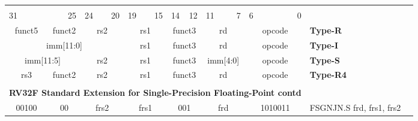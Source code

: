 \documentclass{report}
\begin{document}
\begin{table}[p]
\begin{small}
\begin{center}
\begin{tabular}{p{0.05mm}p{0.05mm}p{0.05mm}p{0.05mm}p{0.05mm}p{0.05mm}p{0.05mm}p{0.05mm}p{0.05mm}p{0.05mm}p{0.05mm}p{0.05mm}p{0.05mm}p{0.05mm}p{0.05mm}p{0.05mm}p{0.05mm}p{0.05mm}p{0.05mm}p{0.05mm}p{0.05mm}p{0.05mm}p{0.05mm}p{0.05mm}p{0.05mm}p{0.05mm}p{0.05mm}p{0.05mm}p{0.05mm}p{0.05mm}p{0.05mm}p{0.05mm}p{50mm}l}& & & & & & & & & & & & & & & & & & & & & & & & & & & & & & & & & \\
\multicolumn{3}{l}{\scriptsize{31}} & \multicolumn{4}{r}{\scriptsize{25}} & \multicolumn{2}{l}{\scriptsize{24}} & \multicolumn{3}{r}{\scriptsize{20}} & \multicolumn{2}{l}{\scriptsize{19}} & \multicolumn{3}{r}{\scriptsize{15}} & \multicolumn{1}{l}{\scriptsize{14}} & \multicolumn{2}{r}{\scriptsize{12}} & \multicolumn{2}{l}{\scriptsize{11}} & \multicolumn{3}{r}{\scriptsize{7}} & \multicolumn{3}{l}{\scriptsize{6}} & \multicolumn{4}{r}{\scriptsize{0}} &  \\
\cline{1-32}
\multicolumn{5}{|c|}{funct5} & \multicolumn{2}{c|}{funct2} & \multicolumn{5}{c|}{rs2} & \multicolumn{5}{c|}{rs1} & \multicolumn{3}{c|}{funct3} & \multicolumn{5}{c|}{rd} & \multicolumn{7}{c|}{opcode} & \scriptsize{\bf Type-R} \\
\cline{1-32}
\multicolumn{12}{|c|}{imm[11:0]} & \multicolumn{5}{c|}{rs1} & \multicolumn{3}{c|}{funct3} & \multicolumn{5}{c|}{rd} & \multicolumn{7}{c|}{opcode} & \scriptsize{\bf Type-I} \\
\cline{1-32}
\multicolumn{7}{|c|}{imm[11:5]} & \multicolumn{5}{c|}{rs2} & \multicolumn{5}{c|}{rs1} & \multicolumn{3}{c|}{funct3} & \multicolumn{5}{c|}{imm[4:0]} & \multicolumn{7}{c|}{opcode} & \scriptsize{\bf Type-S} \\
\cline{1-32}
\multicolumn{5}{|c|}{rs3} & \multicolumn{2}{c|}{funct2} & \multicolumn{5}{c|}{rs2} & \multicolumn{5}{c|}{rs1} & \multicolumn{3}{c|}{funct3} & \multicolumn{5}{c|}{rd} & \multicolumn{7}{c|}{opcode} & \scriptsize{\bf Type-R4} \\
\cline{1-32}
\tabularnewline
\multicolumn{32}{c}{\bf RV32F Standard Extension for Single-Precision Floating-Point  contd} & \\
\cline{1-32}
\cline{1-32}
\multicolumn{5}{|c|}{00100} & \multicolumn{2}{c|}{00} & \multicolumn{5}{c|}{frs2} & \multicolumn{5}{c|}{frs1} & \multicolumn{3}{c|}{001} & \multicolumn{5}{c|}{frd} & \multicolumn{7}{c|}{1010011} & \scriptsize{FSGNJN.S frd, frs1, frs2} \\

\end{tabular}
\end{center}
\end{small}
\end{table}
\end{document}
